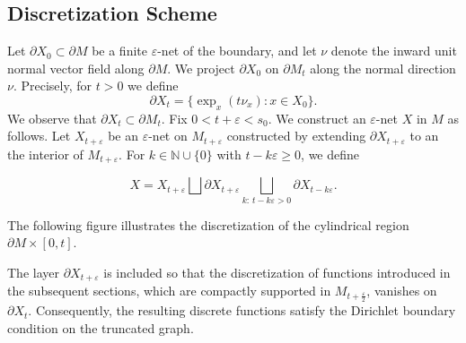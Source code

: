 \documentclass[10 pt, reqno]{amsart}
\theoremstyle{definition}
\numberwithin{equation}{section}
\begin{document}
\subsection{Discretization Scheme} \label{discretization_scheme}

Let $\partial X_0 \subset \partial M$ be a finite $\varepsilon$-net of the boundary, and let $\nu$ denote the inward unit normal vector field along $\partial M$. We project $\partial X_0$ on  $\partial M_t$ along the normal direction $\nu$. Precisely, for $t>0$ we define
\[
\partial X_t = \{ \exp_x(t\nu_x) : x \in X_0 \}.
\]
We observe that $\partial X_t \subset \partial M_t$. Fix $0<t+\varepsilon<s_0$. We construct an $\varepsilon$-net $X$ in $M$ as follows. 
Let $X_{{t+\varepsilon}}$ be an $\varepsilon$-net on $M_{t+\varepsilon} $ constructed by extending  $\partial X_{t+\varepsilon}$ to an the interior of $M_{t+\varepsilon}$. 
For $k\in\mathbb{N}\cup \{0\}$ with $t-k\varepsilon\ge0$, we define

\[
X = X_{t+\varepsilon} \bigsqcup \partial X_{t+\varepsilon} 
\bigsqcup_{k:\, t-k\varepsilon>0} \partial X_{t-k\varepsilon}.
\]

 The following figure illustrates the discretization of the cylindrical region $\partial M \times [0,t]$.
\begin{center}
    

\end{center}
The layer $\partial X_{t+\varepsilon}$ is included so that the discretization of functions introduced in the subsequent sections, which are compactly supported in $M_{t+\frac{\varepsilon}{2}}$, vanishes on $\partial X_t$. Consequently, the resulting discrete functions satisfy the Dirichlet boundary condition on the truncated graph.
\end{document}
